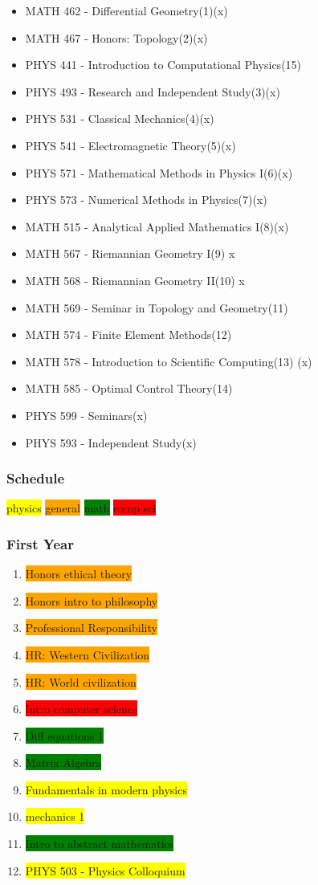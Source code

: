 \begin{itemize}
    \item MATH 462 - Differential Geometry(1)(x)
    \item MATH 467 - Honors: Topology(2)(x)
    \item PHYS 441 - Introduction to Computational Physics(15)
    \item PHYS 493 - Research and Independent Study(3)(x)
    \item PHYS 531 - Classical Mechanics(4)(x)
    \item PHYS 541 - Electromagnetic Theory(5)(x)
    \item PHYS 571 - Mathematical Methods in Physics I(6)(x)
    \item PHYS 573 - Numerical Methods in Physics(7)(x)
    \item MATH 515 - Analytical Applied Mathematics I(8)(x)
    \item MATH 567 - Riemannian Geometry I(9) x
    \item MATH 568 - Riemannian Geometry II(10) x
    \item MATH 569 - Seminar in Topology and Geometry(11)
    \item MATH 574 - Finite Element Methods(12)
    \item MATH 578 - Introduction to Scientific Computing(13) (x)
    \item MATH 585 - Optimal Control Theory(14)
    \item PHYS 599 - Seminars(x)
    \item PHYS 593 - Independent Study(x)
\end{itemize}
\subsubsection{Schedule}
\colorbox{yellow}{physics}
\colorbox{orange}{general}
\colorbox{green}{math}
\colorbox{red}{comp sci}
\subsubsection{First Year}
\begin{enumerate}
    \item  \colorbox{orange}{Honors ethical theory}
    \item  \colorbox{orange}{Honors intro to philosophy}
    \item  \colorbox{orange}{Professional Responsibility}
    \item  \colorbox{orange}{HR: Western Civilization}
    \item  \colorbox{orange}{HR: World civilization}
    \item  \colorbox{red}{Intro computer science}
    \item  \colorbox{green}{Diff equations 1}
    \item  \colorbox{green}{Matrix Algebra}
    \item  \colorbox{yellow}{Fundamentals in modern physics}
    \item  \colorbox{yellow}{mechanics 1}
    \item  \colorbox{green}{Intro to abstract mathematics}
    \item \colorbox{yellow}{PHYS 503 - Physics Colloquium}

\end{enumerate}
